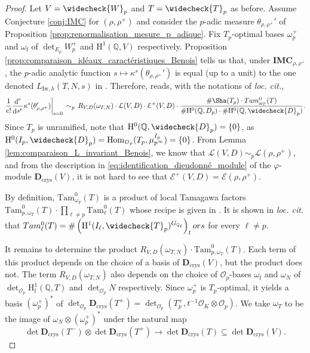 \documentclass[12pt]{amsart}
\newcommand\bQ{\mathbb{Q}}
\newcommand\cE{\mathcal{E}}
\newcommand\cL{\mathcal{L}}
\newcommand\cO{\mathcal{O}}
\DeclareMathOperator{\Hom}{Hom}
\DeclareMathOperator{\diff}{d}
\newcommand{\HH}{\mathrm{H}}
\newcommand{\ff}{\mathrm{f}}
\newcommand{\crys}{\mathrm{crys}}
\newcommand{\Iw}{\mathrm{Iw}}
\theoremstyle{defstyle}
\theoremstyle{thmstyle}
\begin{document}
\begin{proof}
	Let $V=\widecheck{W}_p$ and $T=\widecheck{T}_p$ as before.
	Assume Conjecture \ref{conj:IMC} for $(\rho,\rho^+)$ and consider the $p$-adic measure $\theta_{\rho,\rho^+}'$ of Proposition \ref{prop:renormalisation_mesure_p_adique}. Fix $T_p$-optimal bases $\omega_p^+$ and $\omega_{\ff}$ of $\det_{E_p} W_p^+$ and $\HH^1(\bQ,V)$ respectively. Proposition \ref{prop:comparaison_idéaux_caractéristiques_Benois} tells us that, under \textbf{IMC}$_{\rho,\rho^+}$, the $p$-adic analytic function $s\mapsto \kappa^s(\theta_{\rho,\rho^+}')$ is equal (up to a unit) to the one denoted $L_{\Iw,h}(T,N,s)$ in \cite[§6.2.3]{benoiscrys}. Therefore, \cite[Cor. 2]{benoiscrys} reads, with the notations of \textit{loc. cit.},
	\begin{equation}\label{eq:formule_intermediaire}
		\frac{1}{e!} \dfrac{\diff^e}{\diff \!s^e}\kappa^s(\theta_{\rho,\rho^+}')\bigg|_{s=0} \,\sim_p\, R_{V,D}(\omega_{T,N})\cdot \cL(V,D)\cdot \cE^+(V,D) \cdot \dfrac{\#\Sha({T}_p) \cdot \textrm{Tam}^0_{\omega_T}(T)}{\# \HH^0(\bQ,D_p)\cdot \# \HH^0(\bQ,\widecheck{D}_p)}. 
	\end{equation}
	Since $T_p$ is unramified, note that $\HH^0(\bQ,\widecheck{D}_p)=\{0\}$, as  $\HH^0(I_p,\widecheck{D}_p)=\Hom_{\cO_p}(T_p,\mu_{p^\infty}^{I_p})=\{0\}$. From Lemma \ref{lem:comparaison_L_invariant_Benois}, we know that $\cL(V,D) \sim_p \cL(\rho,\rho^+)$, and from the description in  \eqref{eq:identification_dieudonné_module} of the $\varphi$-module $\textbf{D}_\crys(V)$, it is not hard to see that $\cE^+(V,D)=\cE(\rho,\rho^+)$.
	
	By definition, $\textrm{Tam}^0_{\omega_T}(T)$ is a product of local Tamagawa factors $\textrm{Tam}^0_{p,\omega_T}(T) \cdot \prod_{\ell \neq p} \textrm{Tam}^0_{\ell}(T)$ whose recipe is given in \cite[Chapitre I, \S4.1]{fontaineperrinriou}. It is shown in \textit{loc. cit.} that $\textrm{Tam}^0_{\ell}(T)=\#\left(\HH^1(I_\ell,\widecheck{T}_p)^{G_{\bQ_\ell}}\right)_\textrm{tors}$ for every $\ell \neq p$. 
	
	It remains to determine the product $R_{V,D}(\omega_{T,N})\cdot \textrm{Tam}^0_{p,\omega_T}(T)$. Each term of this product depends on the choice of a basis of $\textbf{D}_{\crys}(V)$, but the product does not. The term $R_{V,D}(\omega_{T,N})$ also depends on the choice of $\cO_p$-bases $\omega_\ff$ and $\omega_N$ of $\det_{\cO_p}\HH_\ff^1(\bQ,T)$ and $\det_{\cO_p}N$ respectively. Since $\omega_p^+$ is $T_p$-optimal, it yields a basis $(\omega_p^+)^*$ of $\det_{\cO_p}\textbf{D}_\crys(T^+)=\det_{\cO_p}(T^+_p,t^{-1}\cO_K \otimes \cO_p)$. We take $\omega_T$ to be the image of $\omega_N \otimes (\omega_p^+)^*$ under the natural map 
	\[\det \textbf{D}_\crys(T^-) \otimes \det  \textbf{D}_\crys(T^+) \longrightarrow \det  \textbf{D}_\crys(T) \subseteq \det  \textbf{D}_\crys(V).\]
	

\end{proof}
\end{document}
